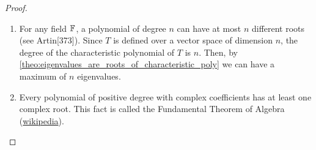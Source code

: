 \documentclass[MathsNotesBase.tex]{subfiles}
\begin{document}
{		\medskip{}
		
		\bigskip
		\begin{proof}
			\begin{enumerate}[label=(\roman*)]
				\item{For any field $\mathbb{F}^{}$, a polynomial of degree $n$ can have at most $n$ different roots (see Artin[373]). Since $T$ is defined over a vector space of dimension $n$, the degree of the characteristic polynomial of $T$ is $n$. Then, by \autoref{theo:eigenvalues_are_roots_of_characteristic_poly} we can have a maximum of $n$ eigenvalues.}
				\item{Every polynomial of positive degree with complex coefficients has at least one complex root. This fact is called the Fundamental Theorem of Algebra (\href{https://en.wikipedia.org/wiki/Fundamental_theorem_of_algebra}{wikipedia}).}
			\end{enumerate}
		\end{proof}
	
}
\end{document}
